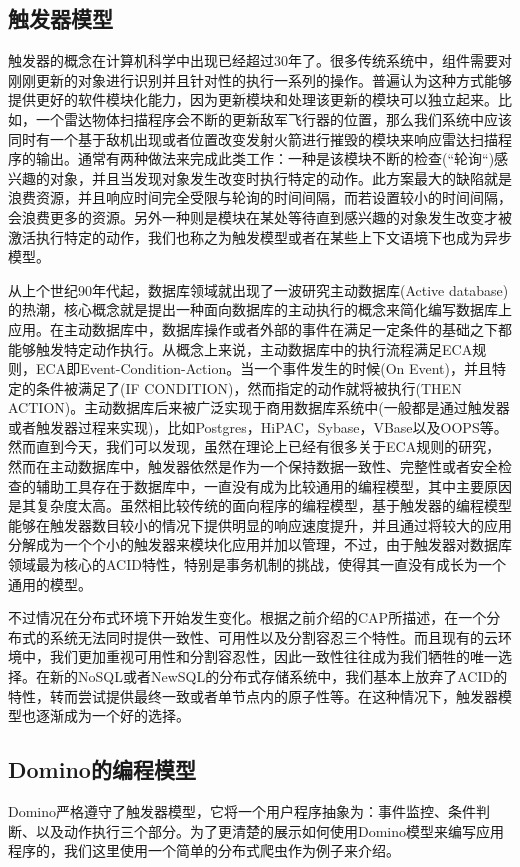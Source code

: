 \subsection{触发器模型}
触发器的概念在计算机科学中出现已经超过30年了。很多传统系统中，组件需要对刚刚更新的对象进行识别并且针对性的执行一系列的操作。普遍认为这种方式能够提供更好的软件模块化能力，因为更新模块和处理该更新的模块可以独立起来。比如，一个雷达物体扫描程序会不断的更新敌军飞行器的位置，那么我们系统中应该同时有一个基于敌机出现或者位置改变发射火箭进行摧毁的模块来响应雷达扫描程序的输出。通常有两种做法来完成此类工作：一种是该模块不断的检查(“轮询“)感兴趣的对象，并且当发现对象发生改变时执行特定的动作。此方案最大的缺陷就是浪费资源，并且响应时间完全受限与轮询的时间间隔，而若设置较小的时间间隔，会浪费更多的资源。另外一种则是模块在某处等待直到感兴趣的对象发生改变才被激活执行特定的动作，我们也称之为触发模型或者在某些上下文语境下也成为异步模型。

从上个世纪90年代起，数据库领域就出现了一波研究主动数据库(Active database)的热潮，核心概念就是提出一种面向数据库的主动执行的概念来简化编写数据库上应用。在主动数据库中，数据库操作或者外部的事件在满足一定条件的基础之下都能够触发特定动作执行。从概念上来说，主动数据库中的执行流程满足ECA规则，ECA即Event-Condition-Action。当一个事件发生的时候(On Event)，并且特定的条件被满足了(IF CONDITION)，然而指定的动作就将被执行(THEN ACTION)。主动数据库后来被广泛实现于商用数据库系统中(一般都是通过触发器或者触发器过程来实现)，比如Postgres，HiPAC，Sybase，VBase以及OOPS等。然而直到今天，我们可以发现，虽然在理论上已经有很多关于ECA规则的研究，然而在主动数据库中，触发器依然是作为一个保持数据一致性、完整性或者安全检查的辅助工具存在于数据库中，一直没有成为比较通用的编程模型，其中主要原因是其复杂度太高。虽然相比较传统的面向程序的编程模型，基于触发器的编程模型能够在触发器数目较小的情况下提供明显的响应速度提升，并且通过将较大的应用分解成为一个个小的触发器来模块化应用并加以管理，不过，由于触发器对数据库领域最为核心的ACID特性，特别是事务机制的挑战，使得其一直没有成长为一个通用的模型。

不过情况在分布式环境下开始发生变化。根据之前介绍的CAP所描述，在一个分布式的系统无法同时提供一致性、可用性以及分割容忍三个特性。而且现有的云环境中，我们更加重视可用性和分割容忍性，因此一致性往往成为我们牺牲的唯一选择。在新的NoSQL或者NewSQL的分布式存储系统中，我们基本上放弃了ACID的特性，转而尝试提供最终一致或者单节点内的原子性等。在这种情况下，触发器模型也逐渐成为一个好的选择。

\subsection{Domino的编程模型}
Domino严格遵守了触发器模型，它将一个用户程序抽象为：事件监控、条件判断、以及动作执行三个部分。为了更清楚的展示如何使用Domino模型来编写应用程序的，我们这里使用一个简单的分布式爬虫作为例子来介绍。

